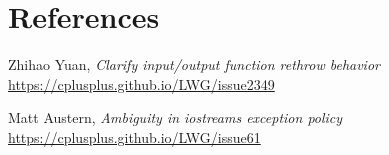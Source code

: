 \documentclass{wg21}
\begin{document}
\section{References}
\renewcommand{\section}[2]{}%
\begin{thebibliography}{9}

  Zhihao Yuan,
  \emph{Clarify input/output function rethrow behavior}\newline
  \url{https://cplusplus.github.io/LWG/issue2349}

  Matt Austern,
  \emph{Ambiguity in iostreams exception policy}\newline
  \url{https://cplusplus.github.io/LWG/issue61}

\end{thebibliography}
\end{document}
